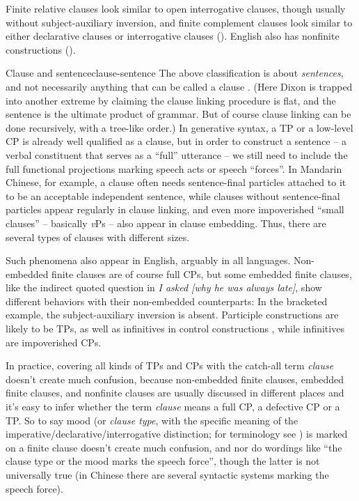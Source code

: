 \documentclass[UTF8, a4paper, oneside, scheme=plain]{ctexrep}
\newcommand*{\term}[1]{\emph{#1}}
\newcommand{\corpus}[1]{\emph{#1}}
\newcommand{\vP}{\textit{v}P}
\begin{document}
Finite relative clauses look similar to open interrogative clauses,
though usually without subject-auxiliary inversion,
and finite complement clauses look similar to either declarative clauses or interrogative clauses 
().
English also has nonfinite constructions ().

\begin{theorybox}{Clause and sentence}{clause-sentence}
    The above classification is about \emph{sentences}, 
    and not necessarily anything that can be called a clause \citet[96]{dixon2009basic1}.
    (Here Dixon is trapped into another extreme by claiming 
    the clause linking procedure is flat,
    and the sentence is the ultimate product of grammar.
    But of course clause linking can be done recursively,
    with a tree-like order.)
    In generative syntax, 
    a TP or a low-level CP is already well qualified as a clause,
    but in order to construct a sentence -- a verbal constituent 
    that serves as a ``full'' utterance --
    we still need to include the full functional projections marking speech acts or speech ``forces''.
    In Mandarin Chinese, for example,
    a clause often needs sentence-final particles attached to it to be an acceptable independent sentence,
    while clauses without sentence-final particles appear regularly in 
    clause linking,
    and even more impoverished ``small clauses'' -- basically \vP{}s -- also appear in clause embedding.
    Thus, there are several types of clauses with different sizes.

    Such phenomena also appear in English, arguably in all languages.
    Non-embedded finite clauses are of course full CPs,
    but some embedded finite clauses,
    like the indirect quoted question in \corpus{I asked [why he was always late]},
    show different behaviors with their non-embedded counterparts:
    In the bracketed example, the subject-auxiliary inversion is absent.
    Participle constructions are likely to be TPs, as well as infinitives in control constructions
    \citep{pires2006minimalist},
    while infinitives are impoverished CPs. 

    In practice, covering all kinds of TPs and CPs with the catch-all term \term{clause}
    doesn't create much confusion,
    because non-embedded finite clauses, 
    embedded finite clauses, and nonfinite clauses are usually discussed in different places 
    and it's easy to infer whether the term \term{clause} 
    means a full CP, a defective CP or a TP. 
    So to say mood (or \term{clause type}, 
    with the specific meaning of the imperative/declarative/interrogative distinction;
    for terminology see )
    is marked on a finite clause doesn't create much confusion, 
    and nor do wordings like ``the clause type or the mood marks the speech force'',
    though the latter is not universally true
    (in Chinese there are several syntactic systems marking the speech force).
\end{theorybox}
\end{document}
